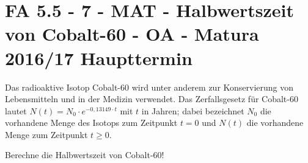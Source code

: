 \section{FA 5.5 - 7 - MAT - Halbwertszeit von Cobalt-60 - OA - Matura 2016/17 Haupttermin}

\begin{beispiel}[FA 5.5]{1} %
Das radioaktive Isotop Cobalt-60 wird unter anderem zur Konservierung von Lebensmitteln und in
der Medizin verwendet. Das Zerfallsgesetz für Cobalt-60 lautet $N(t) = N_0\cdot e^{-0,13149 \cdot t}$ mit $t$ in Jahren; dabei bezeichnet $N_0$ die vorhandene Menge des Isotops zum Zeitpunkt $t = 0$ und $N(t)$ die vorhandene Menge zum Zeitpunkt $t \geq 0$. \leer

Berechne die Halbwertszeit von Cobalt-60!

\end{beispiel}